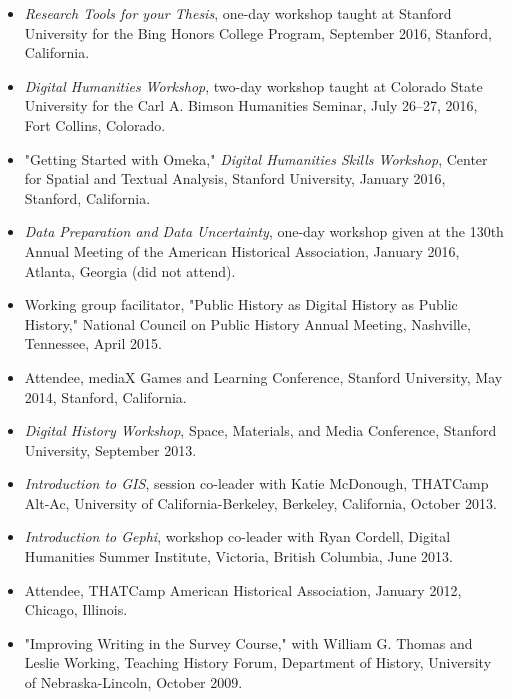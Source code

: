 \documentclass[10pt]{article}
\begin{document}
\begin{itemize}
  \item \textit{Research Tools for your Thesis}, one-day workshop taught at Stanford University for the Bing Honors College Program, September 2016, Stanford, California.
  
  \item \textit{Digital Humanities Workshop}, two-day workshop taught at Colorado State University for the Carl A. Bimson Humanities Seminar, July 26--27, 2016, Fort Collins, Colorado.
  
  \item "Getting Started with Omeka," \textit{Digital Humanities Skills Workshop}, Center for Spatial and Textual Analysis, Stanford University, January 2016, Stanford, California.
  
  \item \textit{Data Preparation and Data Uncertainty}, one-day workshop given at the 130th Annual Meeting of the American Historical Association, January 2016, Atlanta, Georgia (did not attend).
  
  \item Working group facilitator, "Public History as Digital History as Public History," National Council on Public History Annual Meeting, Nashville, Tennessee, April 2015.
  
  \item Attendee, mediaX Games and Learning Conference, Stanford University, May 2014, Stanford, California.
  
  \item \textit{Digital History Workshop}, Space, Materials, and Media Conference, Stanford University, September 2013.
  
  \item \textit{Introduction to GIS}, session co-leader with Katie McDonough, THATCamp Alt-Ac, University of California-Berkeley, Berkeley, California, October 2013.
  
  \item \textit{Introduction to Gephi}, workshop co-leader with Ryan Cordell, Digital Humanities Summer Institute, Victoria, British Columbia, June 2013.
  
  \item Attendee, THATCamp American Historical Association, January 2012, Chicago, Illinois.
  
  \item "Improving Writing in the Survey Course," with William G. Thomas and Leslie Working, Teaching History Forum, Department of History, University of Nebraska-Lincoln, October 2009.
\end{itemize}
\end{document}
